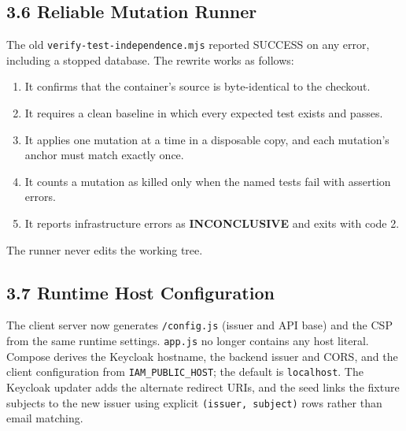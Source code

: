\documentclass{article}
\begin{document}
\subsection*{3.6 Reliable Mutation Runner}
The old \texttt{verify-test-independence.mjs} reported SUCCESS on any error, including a stopped database. The rewrite works as follows:

\begin{enumerate}
    \item It confirms that the container's source is byte-identical to the checkout.
    \item It requires a clean baseline in which every expected test exists and passes.
    \item It applies one mutation at a time in a disposable copy, and each mutation's anchor must match exactly once.
    \item It counts a mutation as killed only when the named tests fail with assertion errors.
    \item It reports infrastructure errors as \textbf{INCONCLUSIVE} and exits with code 2.
\end{enumerate}

The runner never edits the working tree.

\subsection*{3.7 Runtime Host Configuration}
The client server now generates \texttt{/config.js} (issuer and API base) and the CSP from the same runtime settings. \texttt{app.js} no longer contains any host literal. Compose derives the Keycloak hostname, the backend issuer and CORS, and the client configuration from \texttt{IAM\_PUBLIC\_HOST}; the default is \texttt{localhost}. The Keycloak updater adds the alternate redirect URIs, and the seed links the fixture subjects to the new issuer using explicit \texttt{(issuer, subject)} rows rather than email matching.
\end{document}
